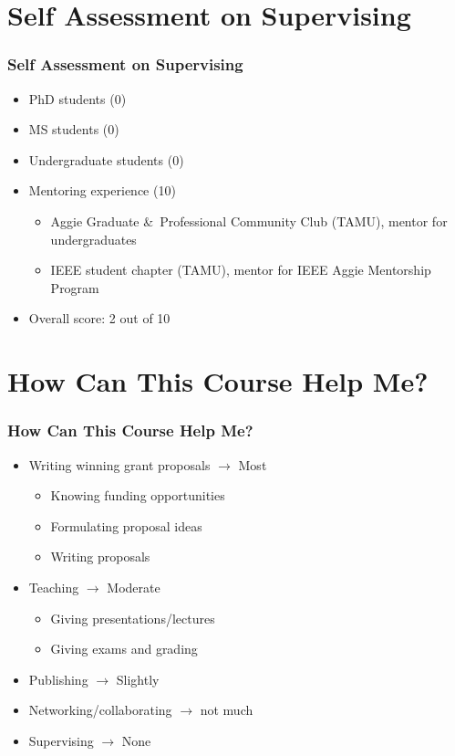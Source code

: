 \documentclass[xcolor={usenames,dvipsnames},hyperref={hyperindex,bookmarks}]{beamer}
\begin{document}
\section{Self Assessment on Supervising}

\frame
{
	\frametitle{Self Assessment on Supervising}

	\begin{itemize}
	\item PhD students (0)
	\item MS students (0)
	\item Undergraduate students (0)
	\item Mentoring experience (10)
		\begin{itemize}
		\item Aggie Graduate \&\ Professional Community Club (TAMU), mentor for undergraduates
		\item IEEE student chapter (TAMU), mentor for IEEE Aggie Mentorship Program
		\end{itemize}
	\item Overall score: 2 out of 10
	\end{itemize}
}




\section{How Can This Course Help Me?}

\frame
{
	\frametitle{How Can This Course Help Me?}

	\begin{itemize}
	\item Writing winning grant proposals $\longrightarrow$ Most
		\begin{itemize}
		\item Knowing funding opportunities
		\item Formulating proposal ideas
		\item Writing proposals
		\end{itemize}
	\item Teaching $\longrightarrow$ Moderate
		\begin{itemize}
		\item Giving presentations/lectures
		\item Giving exams and grading 
		\end{itemize}
	\item Publishing $\longrightarrow$ Slightly
	\item Networking/collaborating $\longrightarrow$ not much
	\item Supervising $\longrightarrow$ None
	\end{itemize}
}
\end{document}
